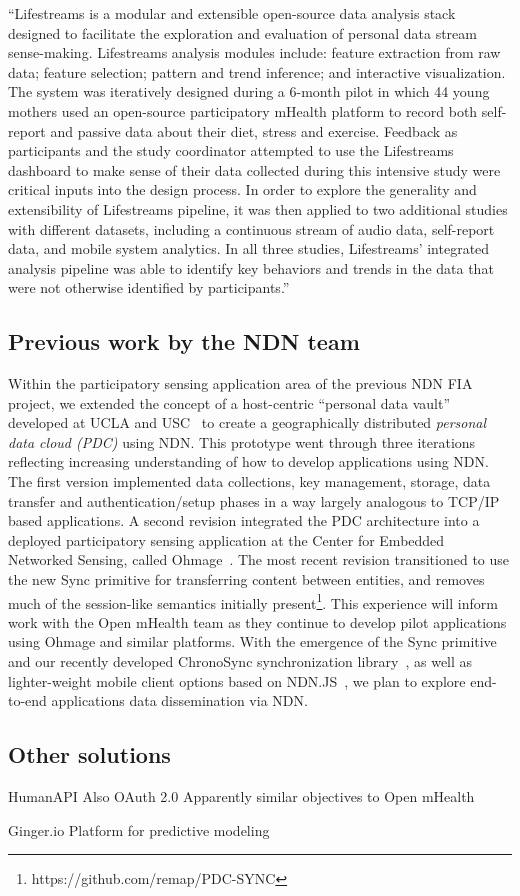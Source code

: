 ``Lifestreams is a modular and extensible open-source data analysis stack designed to facilitate the exploration and evaluation of personal data stream sense-making. Lifestreams analysis modules include: feature extraction from raw data; feature selection; pattern and trend inference; and interactive visualization. The system was iteratively designed during a 6-month pilot in which 44 young mothers used an open-source participatory mHealth platform to record both self-report and passive data about their diet, stress and exercise. Feedback as participants and the study coordinator attempted to use the Lifestreams dashboard to make sense of their data collected during this intensive study were critical inputs into the design process. In order to explore the generality and extensibility of Lifestreams pipeline, it was then applied to two additional studies with different datasets, including a continuous stream of audio data, self-report data, and mobile system analytics. In all three studies, Lifestreams' integrated analysis pipeline was able to identify key behaviors and trends in the data that were not otherwise identified by participants.''
\cite{hsieh2013lifestreams}

\subsection{Previous work by the NDN team}

Within the participatory sensing application area of the previous NDN
FIA project, we extended the concept of a host-centric ``personal data
vault'' developed at UCLA and USC~\cite{mun2010personal} to create a
geographically distributed \emph{personal data cloud (PDC)} using NDN.
This prototype went through three iterations reflecting increasing
understanding of how to develop applications using NDN.   The first
version implemented data collections, key management, storage, data
transfer and authentication/setup phases in a way largely analogous to
TCP/IP based applications.  A second revision integrated the PDC
architecture into a deployed participatory sensing application at the
Center for Embedded Networked Sensing, called
Ohmage~\cite{ramanathan2012ohmage}.
The most recent revision transitioned to use the
new Sync primitive for transferring content between entities, and removes
much of the session-like semantics initially
present\footnote{https://github.com/remap/PDC-SYNC}. This experience
will inform work with the Open mHealth team as they continue to develop
pilot applications using Ohmage and similar platforms. With the emergence
of the Sync primitive and our recently developed
ChronoSync synchronization library~\cite{Afanasyev13:CHRONOSYNC}, as well as lighter-weight mobile client
options based on NDN.JS~\cite{ndn-js-NOMEN}, we plan to explore end-to-end applications data dissemination via NDN.





\subsection{Other solutions}

HumanAPI
Also OAuth 2.0
Apparently similar objectives to Open mHealth

Ginger.io
Platform for predictive modeling
